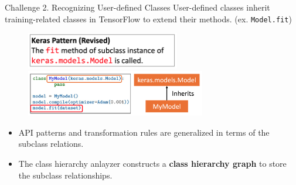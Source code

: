 \documentclass{beamer}
\begin{document}
\begin{frame}{Challenge 2. Recognizing User-defined Classes}
  User-defined classes inherit training-related classes in TensorFlow
  to extend their methods. (ex. {\tt Model.fit}) 

  \begin{figure}
    \centering
    \includegraphics[width=0.6\textwidth]{revisedpattern}
    \includegraphics[width=0.7\textwidth]{chg}
  \end{figure}

  {\footnotesize
  \begin{itemize}
  \item API patterns and transformation rules are generalized
  in terms of the subclass relations. 
   
  \item The class hierarchy anlayzer
  constructs a \textbf{class hierarchy graph} to store the subclass relationships. 
  \end{itemize}
  }

\end{frame}
\end{document}
